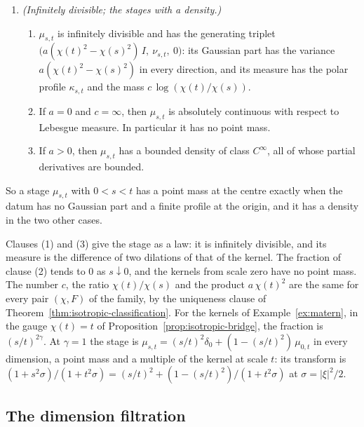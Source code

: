 \begin{proposition}
\begin{enumerate}
\begin{enumerate}
function of integral $1 - \lambda^c$, the operator of the stage is
\[
  \mu_{s,t} * f = \Bigl(\frac{\chi(s)}{\chi(t)}\Bigr)^{c} f + p_{s,t} * f ,
  \qquad f \in L^1(\RR^d) .
\]
\item[(d)] \emph{(Not self-decomposable.)} $\mu_{s,t}$ is not self-decomposable.
\end{enumerate}
\item \emph{(Infinitely divisible; the stages with a density.)}
\begin{enumerate}
\item[(a)] $\mu_{s,t}$ is infinitely divisible and has the generating triplet
$\bigl(a(\chi(t)^2 - \chi(s)^2)\,I,\ \nu_{s,t},\ 0\bigr)$: its Gaussian part has the variance
$a(\chi(t)^2 - \chi(s)^2)$ in every direction, and its \Levy{} measure has the polar profile
$\kappa_{s,t}$ and the mass $c\,\log(\chi(t)/\chi(s))$.
\item[(b)] If $a = 0$ and $c = \infty$, then $\mu_{s,t}$ is absolutely continuous with respect
to Lebesgue measure. In particular it has no point mass.
\item[(c)] If $a > 0$, then $\mu_{s,t}$ has a bounded density of class $C^\infty$, all of whose
partial derivatives are bounded.
\end{enumerate}
\end{enumerate}
So a stage $\mu_{s,t}$ with $0 < s < t$ has a point mass at the centre exactly when the datum
has no Gaussian part and a finite profile at the origin, and it has a density in the two other
cases.
\end{proposition}

Clauses (1) and (3) give the stage as a law: it is infinitely divisible, and its \Levy{}
measure is the difference of two dilations of that of the kernel. The fraction of clause (2) tends to $0$
as $s \downarrow 0$, and the kernels from scale zero have no point mass. The number $c$, the
ratio $\chi(t)/\chi(s)$ and the product $a\,\chi(t)^2$ are the same for every pair
$(\chi, F)$ of the family, by the uniqueness clause of
Theorem~\ref{thm:isotropic-classification}. For the \Matern{} kernels of
Example~\ref{ex:matern}, in the gauge $\chi(t) = t$ of
Proposition~\ref{prop:isotropic-bridge}, the fraction is $(s/t)^{2\gamma}$. At $\gamma = 1$ the
stage is $\mu_{s,t} = (s/t)^2\delta_0 + (1 - (s/t)^2)\,\mu_{0,t}$ in every dimension, a point
mass and a multiple of the kernel at scale $t$: its transform is
$(1 + s^2\sigma)/(1 + t^2\sigma) = (s/t)^2 + (1 - (s/t)^2)/(1 + t^2\sigma)$ at
$\sigma = |\xi|^2/2$.

\subsection{The dimension filtration}\label{sec:isotropic-filtration}

